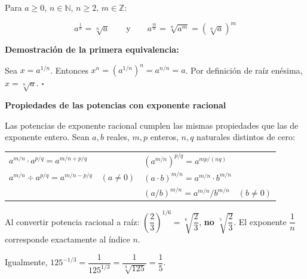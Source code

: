 \documentclass[11pt, letterpaper]{article}
\begin{document}
\begin{tcolorbox}[importantbox, title={Equivalencia fundamental}]
Para $a\geq 0$, $n\in\mathbb{N}$, $n\geq 2$, $m\in\mathbb{Z}$:

$$\boxed{a^{\frac{1}{n}} = \sqrt[n]{a}} \qquad \text{y} \qquad \boxed{a^{\frac{m}{n}} = \sqrt[n]{a^m} = \left(\sqrt[n]{a}\right)^m}$$

\textbf{Demostración de la primera equivalencia:}

Sea $x=a^{1/n}$. Entonces $x^n=\left(a^{1/n}\right)^n=a^{n/n}=a$. Por definición de raíz enésima, $x=\sqrt[n]{a}$. $\square$

\textbf{Propiedades de las potencias con exponente racional}

Las potencias de exponente racional cumplen las mismas propiedades que las de exponente entero. Sean $a, b$ reales, $m, p$ enteros, $n, q$ naturales distintos de cero:

\begin{center}
\renewcommand{\arraystretch}{1.4}
\begin{tabular}{l@{\quad}l}
$a^{m/n}\cdot a^{p/q} = a^{m/n+p/q}$ & $\left(a^{m/n}\right)^{p/q} = a^{mp/(nq)}$\\[4pt]
$a^{m/n}\div a^{p/q} = a^{m/n-p/q}\quad(a\neq 0)$ & $(a\cdot b)^{m/n} = a^{m/n}\cdot b^{m/n}$\\[4pt]
& $(a/b)^{m/n} = a^{m/n}/b^{m/n}\quad(b\neq 0)$
\end{tabular}
\end{center}
\end{tcolorbox}

\begin{tcolorbox}[warningbox, title={Error frecuente}]
Al convertir potencia racional a raíz: $\left(\dfrac{2}{3}\right)^{1/6}=\sqrt[6]{\dfrac{2}{3}}$, \textbf{no} $\sqrt[5]{\dfrac{2}{3}}$. El exponente $\dfrac{1}{n}$ corresponde exactamente al índice $n$.

Igualmente, $125^{-1/3}=\dfrac{1}{125^{1/3}}=\dfrac{1}{\sqrt[3]{125}}=\dfrac{1}{5}$.
\end{tcolorbox}
\end{document}
